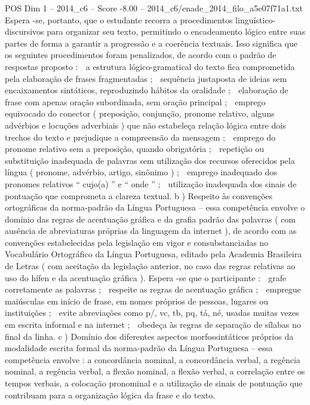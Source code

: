 \begin{textsample}{POS Dim 1 – 2014\_c6 – Score -8.00 – 2014\_c6/enade\_2014\_filo\_a5e07f71a1.txt}
Espera -se, portanto, que o estudante recorra a procedimentos linguístico-discursivos para organizar seu texto, permitindo o encadeamento lógico entre suas partes de forma a garantir a progressão e a coerência textuais.
Isso significa que os seguintes procedimentos foram penalizados, de acordo com o padrão de respostas proposto :  a estrutura lógico-gramatical do texto fica comprometida pela elaboração de frases fragmentadas ;  sequência justaposta de ideias sem encaixamentos sintáticos, reproduzindo hábitos da oralidade ;  elaboração de frase com apenas oração subordinada, sem oração principal ;  emprego equivocado do conector ( preposição, conjunção, pronome relativo, alguns advérbios e locuções adverbiais ) que não estabeleça relação lógica entre dois trechos do texto e prejudique a compreensão da mensagem ;  emprego do pronome relativo sem a preposição, quando obrigatória ;  repetição ou substituição inadequada de palavras sem utilização dos recursos oferecidos pela língua ( pronome, advérbio, artigo, sinônimo ) ;  emprego inadequado dos pronomes relativos “ cujo(a) ” e “ onde ” ;  utilização inadequada dos sinais de pontuação que comprometa a clareza textual. b ) Respeito às convenções ortográficas da norma-padrão da Língua Portuguesa – essa competência envolve o domínio das regras de acentuação gráfica e da grafia padrão das palavras ( com ausência de abreviaturas próprias da linguagem da internet ), de acordo com as convenções estabelecidas pela legislação em vigor e consubstanciadas no Vocabulário Ortográfico da Língua Portuguesa, editado pela Academia Brasileira de Letras ( com aceitação da legislação anterior, no caso das regras relativas ao uso do hífen e da acentuação gráfica ).
Espera -se que o participante :  grafe corretamente as palavras ;  respeite as regras de acentuação gráfica ;  empregue maiúsculas em início de frase, em nomes próprios de pessoas, lugares ou instituições ;  evite abreviações como p/, vc, tb, pq, tá, né, usadas muitas vezes em escrita informal e na internet ;  obedeça às regras de separação de sílabas no final da linha. c ) Domínio dos diferentes aspectos morfossintáticos próprios da modalidade escrita formal da norma-padrão da Língua Portuguesa – essa competência envolve : a concordância nominal, a concordância verbal, a regência nominal, a regência verbal, a flexão nominal, a flexão verbal, a correlação entre os tempos verbais, a colocação pronominal e a utilização de sinais de pontuação que contribuam para a organização lógica da frase e do texto.

\end{textsample}
